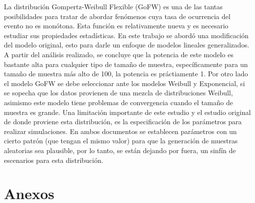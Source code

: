 \documentclass[12pt,a4paper]{article}
\begin{document}
La distribución Gompertz-Weibull Flexible (GoFW) es una de las tantas posibilidades para tratar de abordar fenómenos cuya tasa de ocurrencia del evento no es monótona. Esta función es relativamente nueva y es necesario estudiar sus propiedades estadísticas. En este trabajo se abordó una modificación del modelo original, esto para darle un enfoque de modelos lineales generalizados. A partir del análisis realizado, se concluye que la potencia de este modelo es bastante alta para cualquier tipo de tamaño de muestra, específicamente para un tamaño de muestra más alto de 100, la potencia es práctiamente 1. Por otro lado el modelo GoFW se debe seleccionar ante los modelos Weibull y Exponencial, si se sopecha que los datos provienen de una mezcla de distribuciones Weibull, asimismo este modelo tiene problemas de convergencia cuando el tamaño de muestra es grande. Una limitación importante de este estudio y el estudio original de donde proviene esta distribución, es la especificación de los parámetros para realizar simulaciones. En ambos documentos se establecen parámetros con un cierto patrón (que tengan el mismo valor) para que la generación de muestras aleatorias sea plausible, por lo tanto, se están dejando por fuera, un sinfín de escenarios para esta distribución.

\section{Anexos}
\end{document}
